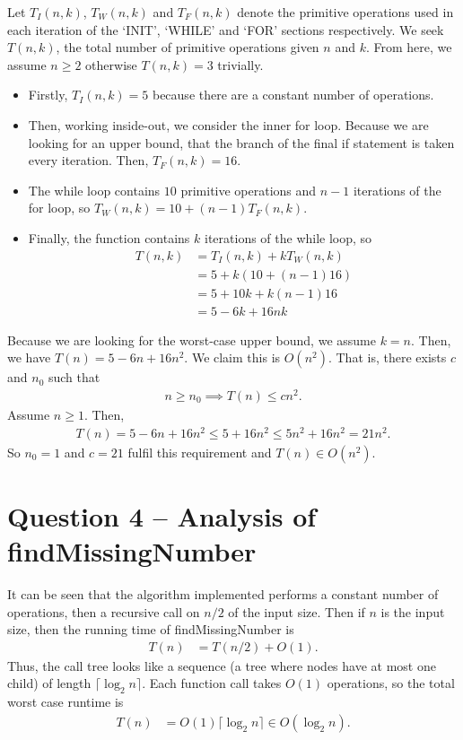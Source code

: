 \documentclass[11pt,a4paper]{article} %
\begin{document}
Let $T_I(n, k)$, $T_W(n, k)$ and $T_F(n, k)$ denote the primitive operations used in 
each iteration of the `INIT', `WHILE' and `FOR' sections respectively. We seek $T(n, k)$, the total
number of primitive operations given $n$ and $k$. From here, we assume $n \ge 2$
otherwise $T(n, k) = 3$ trivially.
\begin{itemize}
    \item Firstly, $T_I(n, k) = 5$ because there are a constant number of operations.
    \item Then, working inside-out, we consider the inner for loop. Because we are looking for
    an upper bound, that the branch of the final if statement is taken every iteration.
    Then, $T_F(n, k) = 16$.
    \item The while loop contains $10$ primitive operations and $n-1$ iterations of the for loop, so 
    $T_W(n, k) = 10 + (n-1)T_F(n, k)$.
    \item Finally, the function contains $k$ iterations of the while loop, so 
    \begin{align*}
        T(n, k) &= T_I(n, k) + k T_W(n, k) \\ 
        &= 5 + k(10 + (n-1)16) \\ 
        &= 5 + 10k + k(n-1)16 \\ 
        &= 5 - 6k + 16nk
    \end{align*}
\end{itemize}
Because we are looking for the worst-case upper bound, we assume $k = n$. Then, we have 
$T(n) = 5 - 6n + 16n^2$. We claim this is $O(n^2)$. That is, there exists $c$ and $n_0$ such that 
\begin{align*}
    n \ge n_0 \implies T(n) \le cn^2.
\end{align*}
Assume $n \ge 1$. Then,
\begin{align*}
    T(n) = 5 - 6n + 16n^2 \le 5 + 16n^2 \le 5n^2 + 16n^2 = 21n^2.
\end{align*}
So $n_0 = 1$ and $c = 21$ fulfil this requirement and $T(n) \in O(n^2)$.


\section*{Question 4 -- {Analysis of {findMissingNumber}}}
It can be seen that the algorithm implemented performs a constant 
number of operations, then a recursive call on $n/2$ of the input size.
Then if $n$ is the input size, then the running time of findMissingNumber
is
\begin{align*}
    T(n) &= T(n/2) + O(1).
\end{align*}
Thus, the call tree looks like a sequence (a tree where nodes have at most one child)
of length $\lceil \log_2 n\rceil$. Each function call takes $O(1)$ operations, so the total 
worst case runtime is 
\begin{align*}
    T(n) &= O(1)\lceil \log_2 n\rceil  \in O(\log_2 n).
\end{align*}
\end{document}

